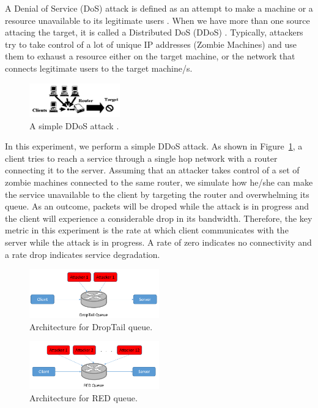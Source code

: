 \documentclass[12pt,twocolumn]{article}
\begin{document}
A Denial of Service (DoS) attack is defined as an attempt to make a machine or a resource unavailable to its legitimate users \cite{bellovin1989security}.
When we have more than one source attacing the target, it is called a Distributed DoS (DDoS) \cite{lau2000distributed}.
Typically, attackers try to take control of a lot of unique IP addresses (Zombie Machines) and use them to exhaust a resource either on the target machine, or the network that connects legitimate users to the target machine/s.


\begin{figure}
    \centering
    \includegraphics[width=0.35\textwidth]{../Figures/sample.png} \caption{A simple DDoS attack \cite{lau2000distributed}.} \label{sampleDDoS}
\end{figure}

In this experiment, we perform a simple DDoS attack.
As shown in Figure~\ref{sampleDDoS}, a client tries to reach a service through a single hop network with a router connecting it to the server.
Assuming that an attacker takes control of a set of zombie machines connected to the same router, we simulate how he/she can make the service unavailable to the client by targeting the router and overwhelming its queue.
As an outcome, packets will be droped while the attack is in progress and the client will experience a considerable drop in its bandwidth.
Therefore, the key metric in this experiment is the rate at which client communicates with the server while the attack is in progress.
A rate of zero indicates no connectivity and a rate drop indicates service degradation.

\begin{figure}
    \centering
    \includegraphics[width=0.5\textwidth]{../Figures/arch1.png} \caption{Architecture for DropTail queue.} \label{arch1}
\end{figure}

\begin{figure}
    \centering
    \includegraphics[width=0.5\textwidth]{../Figures/arch2.png} \caption{Architecture for RED queue.} \label{arch2}
\end{figure}
\end{document}
